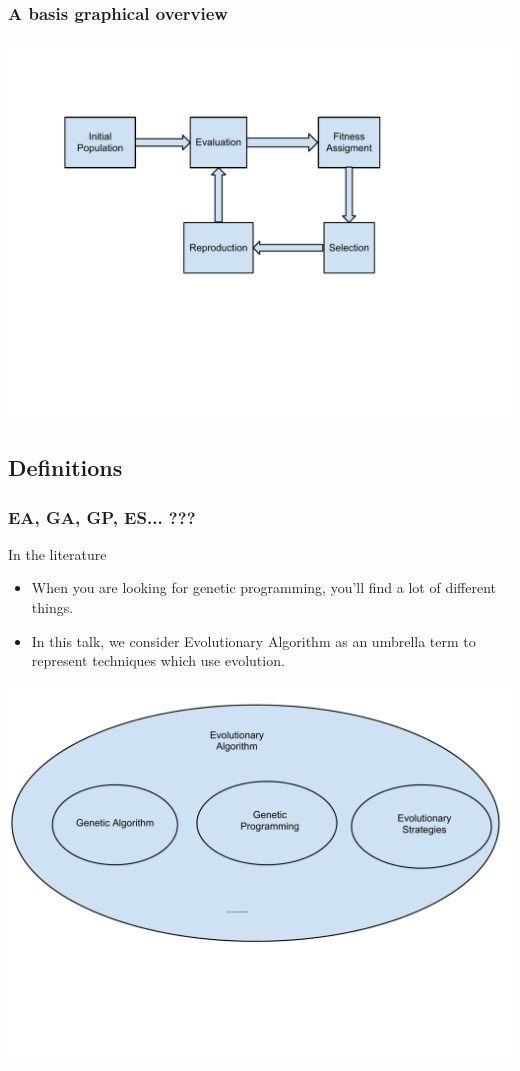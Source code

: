 \begin{frame}
  \frametitle{A basis graphical overview}
  \begin{center}
    \includegraphics[scale=0.5]{img/cycle}
  \end{center}
\end{frame}

\subsection{Definitions}

\begin{frame}
  \frametitle{EA, GA, GP, ES... ???}
  \begin{block}{In the literature}
    \begin{itemize}
    \item When you are looking for genetic programming, you'll find a
      lot of different things.
    \item In this talk, we consider Evolutionary Algorithm as an
      umbrella term to represent techniques which use evolution.
    \end{itemize}
  \end{block}

  \begin{center}
    \includegraphics[scale=0.4]{img/ea}
  \end{center}
\end{frame}

